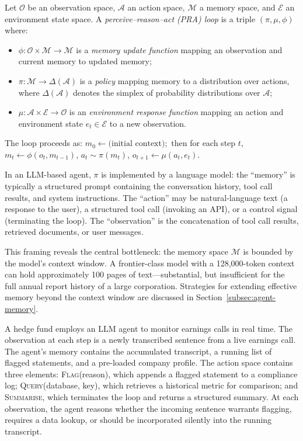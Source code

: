 \begin{deepdive}
\begin{definition}
\label{def:pra-loop}
Let $\mathcal{O}$ be an observation space, $\mathcal{A}$ an action space,
$\mathcal{M}$ a memory space, and $\mathcal{E}$ an environment state space.
A \emph{perceive--reason--act (PRA) loop} is a triple $(\pi, \mu, \phi)$ where:
\begin{itemize}
  \item $\phi: \mathcal{O} \times \mathcal{M} \to \mathcal{M}$ is a \emph{memory
        update function} mapping an observation and current memory to updated memory;
  \item $\pi: \mathcal{M} \to \Delta(\mathcal{A})$ is a \emph{policy} mapping memory
        to a distribution over actions, where $\Delta(\mathcal{A})$ denotes the
        simplex of probability distributions over $\mathcal{A}$;
  \item $\mu: \mathcal{A} \times \mathcal{E} \to \mathcal{O}$ is an
        \emph{environment response function} mapping an action and environment state
        $e_t \in \mathcal{E}$ to a new observation.
\end{itemize}
The loop proceeds as: $m_0 \gets \text{(initial context)};$ then for each step $t$,
$m_t \gets \phi(o_t, m_{t-1})$, $a_t \sim \pi(m_t)$, $o_{t+1} \gets \mu(a_t, e_t)$.
\end{definition}

In an LLM-based agent, $\pi$ is implemented by a language model: the ``memory'' is
typically a structured prompt containing the conversation history, tool call results,
and system instructions. The ``action'' may be natural-language text (a response to
the user), a structured tool call (invoking an API), or a control signal (terminating
the loop). The ``observation'' is the concatenation of tool call results, retrieved
documents, or user messages.

This framing reveals the central bottleneck: the memory space $\mathcal{M}$ is bounded
by the model's context window. A frontier-class model with a 128,000-token context can
hold approximately 100 pages of text---substantial, but insufficient for the full annual
report history of a large corporation. Strategies for extending effective memory beyond
the context window are discussed in Section~\ref{subsec:agent-memory}.

\begin{example}
\label{ex:pra-earnings}
A hedge fund employs an LLM agent to monitor earnings calls in real time. The
observation at each step is a newly transcribed sentence from a live earnings call.
The agent's memory contains the accumulated transcript, a running list of flagged
statements, and a pre-loaded company profile. The action space contains three
elements: \textsc{Flag}(reason), which appends a flagged statement to a compliance
log; \textsc{Query}(database, key), which retrieves a historical metric for
comparison; and \textsc{Summarise}, which terminates the loop and returns a
structured summary. At each observation, the agent reasons whether the incoming
sentence warrants flagging, requires a data lookup, or should be incorporated
silently into the running transcript.
\end{example}


\end{deepdive}
